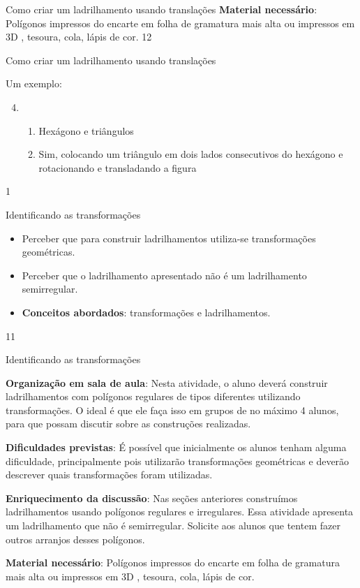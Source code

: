 {\begin{sugestions}{Como criar um ladrilhamento usando translações}
{	\textbf{Material necessário}: Polígonos impressos do encarte em folha de gramatura mais alta ou impressos em 3D , tesoura, cola, lápis de cor.
}{1}{2}
\end{sugestions}
\begin{answer}{Como criar um ladrilhamento usando translações}
{
	Um exemplo:
	\begin{enumerate}
	\setcounter{enumi}{3}
		\item
		\begin{enumerate}
			\item Hexágono e triângulos
			\item Sim, colocando um triângulo em dois lados consecutivos do hexágono e rotacionando e transladando a figura
		\end{enumerate}
	\end{enumerate}
}{1}
\end{answer}
\clearmargin
\begin{objectives}{Identificando as transformações}
{
	\begin{itemize}
	\item Perceber que para construir ladrilhamentos utiliza-se transformações geométricas.
	\item Perceber que o ladrilhamento apresentado não é um ladrilhamento semirregular.
	\item \textbf{Conceitos abordados}: transformações e ladrilhamentos.
	\end{itemize}
}{1}{1}
\end{objectives}
\begin{sugestions}{Identificando as transformações}
{
	\textbf{Organização em sala de aula}: Nesta atividade, o aluno deverá construir ladrilhamentos com polígonos regulares de tipos diferentes utilizando transformações. O ideal é que ele faça isso em grupos de no máximo 4 alunos, para que possam discutir sobre as construções realizadas. 

	\textbf{Dificuldades previstas}: É possível que inicialmente os alunos tenham alguma dificuldade, principalmente pois utilizarão transformações geométricas e deverão descrever quais transformações foram utilizadas.

	\textbf{Enriquecimento da discussão}: Nas seções anteriores construímos ladrilhamentos usando polígonos regulares e irregulares. Essa atividade apresenta um ladrilhamento que não é semirregular. Solicite aos alunos que tentem fazer outros arranjos desses polígonos.


	\textbf{Material necessário}: Polígonos impressos do encarte em folha de gramatura mais alta ou impressos em 3D , tesoura, cola, lápis de cor.

}
\end{sugestions}}
